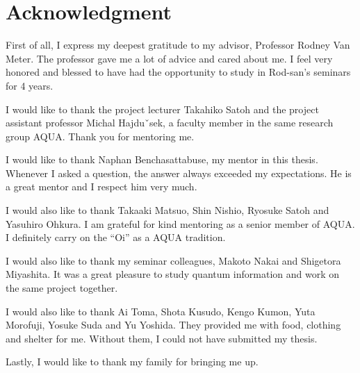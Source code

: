 \chapter*{Acknowledgment}
\label{thanks}
First of all, I express my deepest gratitude to my advisor, Professor Rodney Van Meter.
The professor gave me a lot of advice and cared about me.
I feel very honored and blessed to have had the opportunity to study in Rod-san's seminars for 4 years.

I would like to thank the project lecturer Takahiko Satoh and the project assistant professor Michal Hajduˇsek, a faculty member in the same research group AQUA.
Thank you for mentoring me.

I would like to thank Naphan Benchasattabuse, my mentor in this thesis.
Whenever I asked a question, the answer always exceeded my expectations. 
He is a great mentor and I respect him very much.

I would also like to thank Takaaki Matsuo, Shin Nishio, Ryosuke Satoh and Yasuhiro Ohkura.
I am grateful for kind mentoring as a senior member of AQUA.
I definitely carry on the “Oi” as a AQUA tradition.

I would also like to thank my seminar colleagues, Makoto Nakai and Shigetora Miyashita.
It was a great pleasure to study quantum information and work on the same project together.

I would also like to thank Ai Toma, Shota Kusudo, Kengo Kumon, Yuta Morofuji, Yosuke Suda and Yu Yoshida.
They provided me with food, clothing and shelter for me. 
Without them, I could not have submitted my thesis.

Lastly, I would like to thank my family for bringing me up.
